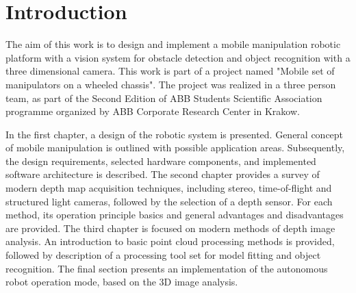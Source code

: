 \chapter*{Introduction}
\label{cha:introduction}



The aim of this work is to design and implement a mobile manipulation robotic platform with a vision system for obstacle detection and object recognition with a three dimensional camera. This work is part of a project named "Mobile set of manipulators on a wheeled chassis". The project was realized in a three person team, as part of the Second Edition of ABB Students Scientific Association programme organized by ABB Corporate Research Center in Krakow.

	In the first chapter, a design of the robotic system is presented. General concept of mobile manipulation is outlined with possible application areas. Subsequently, the design requirements, selected hardware components, and implemented software architecture is described. The second chapter provides a survey of modern depth map acquisition techniques, including stereo, time-of-flight and structured light cameras, followed by the selection of a depth sensor. For each method, its operation principle basics and general advantages and disadvantages are provided. The third chapter is focused on modern methods of depth image analysis. An introduction to basic point cloud processing methods is provided, followed by description of a processing tool set for model fitting and object recognition. The final section presents an implementation of the autonomous robot operation mode, based on the 3D image analysis. 
	
	
\begin{comment}

Tematem pracy jest opis wybranych elementów składowych projektu o nazwie: Mobilny zespół manipulatorów na wspólnej platformie jezdnej. Projekt ten zrealizowany został w ramach Drugiej Edycji Koła Naukowego ABB we współpracy z Korporacyjnym Centrum Badawczym ABB w Krakowie. Zespół projektowy składał się z trzech osób pomiędzy które zostały podzielone zadania. Na tej podstawie zrealizowane zostały trzy prace dyplomowe inżynierskie. Niniejsza, związana z projektem mechanicznym, samodzielnym montażem wszystkich podzespołów oraz z analizą zagadnień kinematycznych zespołu dwóch skonstruowanych manipulatorów oraz dwie inne prace związane z oprogramowaniem operatorskim oraz z systemem akwizycji i przetwarzania danych. Projekt był realizowany w okresie od marca do listopada 2014 roku i jego główną częścią było uruchomienie zbudowanego urządzenia i jego prezentacja podczas uroczystego podsumowania.

\end{comment}









